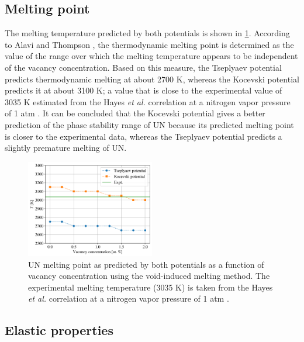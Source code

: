 \documentclass[preprint, 12pt]{elsarticle}
\begin{document}
\subsection{Melting point}

The melting temperature predicted by both potentials is shown in \cref{Fig:Tm}. According to Alavi and Thompson \cite{Alavi2006}, the thermodynamic melting point is determined as the value of the range over which the melting temperature appears to be independent of the vacancy concentration. Based on this measure, the Tseplyaev potential predicts thermodynamic melting at about 2700 K, whereas the Kocevski potential predicts it at about 3100 K; a value that is close to the experimental value of 3035 K estimated from the Hayes \textit{et al.} correlation at a nitrogen vapor pressure of 1 atm \cite{Hayes1990IV}. It can be concluded that the Kocevski potential gives a better prediction of the phase stability range of UN because its predicted melting point is closer to the experimental data, whereas the Tseplyaev potential predicts a slightly premature melting of UN.

\begin{figure}[h!]
\centering
\includegraphics[width=0.5\textwidth]{Tm.png}
\caption{UN melting point as predicted by both potentials as a function of vacancy concentration using the void-induced melting method. The experimental melting temperature (3035 K) is taken from the Hayes \textit{et al.} correlation at a nitrogen vapor pressure of 1 atm \cite{Hayes1990IV}.}
\label{Fig:Tm}
\end{figure}



\subsection{Elastic properties}
\label{Sec:Elastic}
\end{document}

